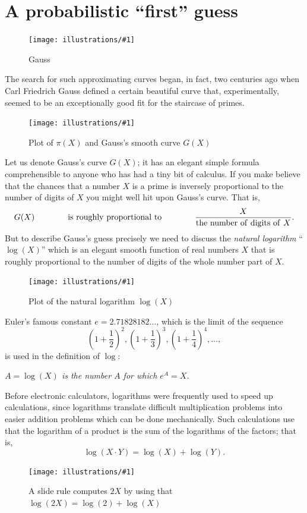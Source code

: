 \documentclass[openany]{book}
\newcommand{\ill}[3]{%
   \begin{figure}[H]%
   \vspace{-2ex}
   \centering%
   \texttt{[image: illustrations/\#1]}%
   \caption{#3}%
   \vspace{-2ex}
    \end{figure}}
\theoremstyle{plain}
\theoremstyle{definition}
\begin{document}
\chapter{A probabilistic ``first'' guess\label{sec:firstguess} }

\ill{gauss}{.3}{Gauss}

The search for such approximating curves began, in fact, two centuries
ago when Carl Friedrich Gauss defined a certain beautiful curve that,
experimentally, seemed to be an exceptionally good fit for the
staircase of primes.

\ill{pi_Li}{.7}{Plot of $\pi(X)$ and Gauss's smooth curve $G(X)$}

Let us denote Gauss's curve $G(X)$; it has an
elegant simple formula comprehensible to anyone who has had a tiny bit
of calculus.  If you make believe that the chances that a number $X$ is
a prime is inversely proportional to the number of digits of $X$ you
might well hit upon Gauss's curve.
That is,
\vskip10pt
$$G(X)\hskip40pt  {\rm is\ roughly\ proportional\ to} \hskip40pt  {\frac{X}{{\rm the\ number\ of\ digits\ of\ } X}}.$$
\vskip10pt
But to describe Gauss's guess precisely we need to discuss the {\it natural logarithm} ``$\log(X)$'' which is an elegant smooth function of real numbers $X$ that is roughly proportional to the number of digits of the whole number part of $X$.



\ill{log}{.8}{Plot of the natural logarithm $\log(X)$}


 Euler's famous constant $e=2.71828182\ldots$, which is the limit
 of the sequence
 $$\left(1+{\frac{1}{2}}\right)^2,
       \left(1+{\frac{1}{3}}\right)^3,
       \left(1+{\frac{1}{4}}\right)^4, \dots,$$
is used in the definition of $\log$:
\begin{center}
{\em $A = \log(X)$ is the number $A$ for which $e^A = X$.}
\end{center}
Before electronic calculators, logarithms were frequently used to
speed up calculations, since logarithms translate difficult multiplication
problems into easier addition problems which can be done mechanically.
Such calculations use that the logarithm of a product is the sum of the logarithms
of the factors; that is, $$\log(X\cdot Y) = \log(X) + \log(Y).$$

\ill{slide_rule}{.8}{A slide rule  computes $2X$ by using that $\log(2X)=\log(2)+\log(X)$\label{fig:slide_rule}}
\end{document}
